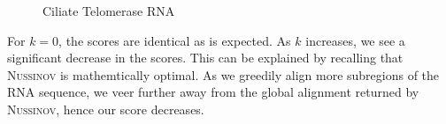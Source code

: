 \documentclass[11pt]{article}
\newcommand{\rf}{\textsc{Nussinov}\xspace}
\begin{document}
\begin{figure}[h!]
\caption{Ciliate Telomerase RNA}
\end{figure}
\newpage

For $k=0$, the scores are identical as is expected. As $k$ increases, we see a significant decrease in the scores. This can be explained by recalling that \rf is mathemtically optimal. As we greedily align more subregions of the RNA sequence, we veer further away from the global alignment returned by \rf, hence our score decreases. 
\end{document}
